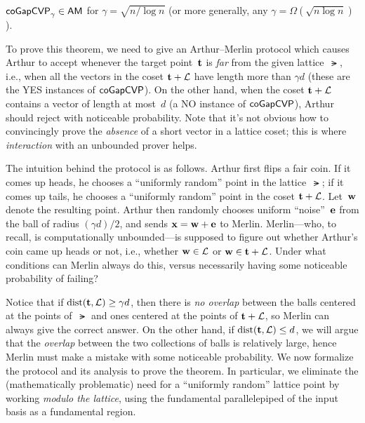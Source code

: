 \documentclass[11pt]{article}
\begin{document}
\begin{theorem}
  \label{thm:gapcvp-coAM}
  $\mathsf{coGapCVP}_{\gamma} \in \mathsf{AM}$ for $\gamma = \sqrt{n/\log n}$ (or more
  generally, any $\gamma = \Omega(\sqrt{n \log n})$).
\end{theorem}

To prove this theorem, we need to give an Arthur--Merlin protocol which
causes Arthur to accept whenever the target point~$\mathbf{t}$ is
\emph{far} from the given lattice~$\lat$, i.e., when all the vectors
in the coset $\mathbf{t}+\mathcal{L}$ have length more than $\gamma d$ (these are
the YES instances of $\mathsf{coGapCVP}$). On the other hand, when the coset
$\mathbf{t}+\mathcal{L}$ contains a vector of length at most~$d$ (a NO instance of
$\mathsf{coGapCVP}$), Arthur should reject with noticeable probability. Note
that it's not obvious how to convincingly prove the \emph{absence} of
a short vector in a lattice coset; this is where \emph{interaction}
with an unbounded prover helps.

The intuition behind the protocol is as follows. Arthur first flips a
fair coin. If it comes up heads, he chooses a ``uniformly random''
point in the lattice~$\lat$; if it comes up tails, he chooses a
``uniformly random'' point in the coset $\mathbf{t} + \mathcal{L}$. Let~$\mathbf{w}$
denote the resulting point. Arthur then randomly chooses uniform
``noise''~$\mathbf{e}$ from the ball of radius $(\gamma d)/2$, and sends
$\mathbf{x} = \mathbf{w} + \mathbf{e}$ to Merlin. Merlin---who, to recall, is
computationally unbounded---is supposed to figure out whether Arthur's
coin came up heads or not, i.e., whether $\mathbf{w} \in \mathcal{L}$ or
$\mathbf{w} \in \mathbf{t} + \mathcal{L}$. Under what conditions can Merlin always do
this, versus necessarily having some noticeable probability of
failing?

Notice that if $\operatorname{dist}(\mathbf{t}, \mathcal{L}) \geq \gamma d$, then there is
\emph{no overlap} between the balls centered at the points of~$\lat$
and ones centered at the points of $\mathbf{t} + \mathcal{L}$, so Merlin can
always give the correct answer. On the other hand, if
$\operatorname{dist}(\mathbf{t}, \mathcal{L}) \leq d$, we will argue that the \emph{overlap}
between the two collections of balls is relatively large, hence Merlin
must make a mistake with some noticeable probability. We now formalize
the protocol and its analysis to prove the theorem. In particular, we
eliminate the (mathematically problematic) need for a ``uniformly
random'' lattice point by working \emph{modulo the lattice}, using the
fundamental parallelepiped of the input basis as a fundamental region.
\end{document}
